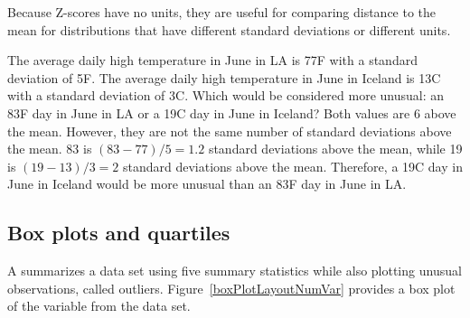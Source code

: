 Because Z-scores have no units, they are useful for comparing distance to the mean for distributions that have different standard deviations or different units.

\begin{examplewrap}
\begin{nexample}
{The average daily high temperature in June in LA is 77\degree F with a standard deviation of 5\degree{}F.  The average daily high temperature in June in Iceland is 13\degree{}C with a standard deviation of 3\degree{}C.  Which would be considered more unusual:  an 83\degree{}F day in June in LA or a 19\degree{}C day in June in Iceland? }
Both values are 6\degree{} above the mean.  However, they are not the same number of standard deviations above the mean.  83 is $(83-77)/5 = 1.2$ standard deviations above the mean, while 19 is $(19-13)/3 = 2$ standard deviations above the mean.  Therefore, a 19\degree{}C day in June in Iceland would be more unusual than an 83\degree{}F day in June in LA.
\end{nexample}
\end{examplewrap}




\subsection{Box plots and quartiles}

A  summarizes a data set using five summary statistics while also plotting unusual observations, called outliers. Figure~\ref{boxPlotLayoutNumVar} provides a box plot of the  variable from the  data set.

